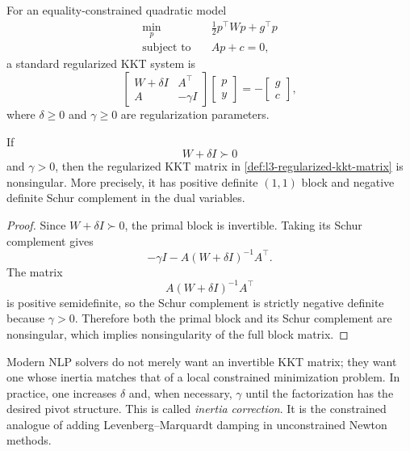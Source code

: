 \begin{definition}\label{def:l3-regularized-kkt-matrix}
	For an equality-constrained quadratic model
	\begin{align*}
		\min_p \quad & \frac{1}{2}p^\top Wp + g^\top p \\
		\text{subject to}\quad & Ap + c = 0,
	\end{align*}
	a standard regularized KKT system is
	\[
		\begin{bmatrix}
			W+\delta I & A^\top \\
			A          & -\gamma I
		\end{bmatrix}
		\begin{bmatrix}
			p \\
			y
		\end{bmatrix}
		=
		-
		\begin{bmatrix}
			g \\
			c
		\end{bmatrix},
	\]
	where $\delta \ge 0$ and $\gamma \ge 0$ are regularization parameters.
\end{definition}

\begin{proposition}\label{prop:l3-quasi-definiteness-under-regularization}
	If
	\[
		W+\delta I \succ 0
	\]
	and $\gamma>0$, then the regularized KKT matrix in \autoref{def:l3-regularized-kkt-matrix} is nonsingular. More precisely, it has positive definite $(1,1)$ block and negative definite Schur complement in the dual variables.
\end{proposition}
\begin{proof}
	Since $W+\delta I \succ 0$, the primal block is invertible. Taking its Schur complement gives
	\[
		-\gamma I - A(W+\delta I)^{-1}A^\top.
	\]
	The matrix
	\[
		A(W+\delta I)^{-1}A^\top
	\]
	is positive semidefinite, so the Schur complement is strictly negative definite because $\gamma>0$. Therefore both the primal block and its Schur complement are nonsingular, which implies nonsingularity of the full block matrix.
\end{proof}

\begin{remark}
	Modern NLP solvers do not merely want an invertible KKT matrix; they want one whose inertia matches that of a local constrained minimization problem. In practice, one increases $\delta$ and, when necessary, $\gamma$ until the factorization has the desired pivot structure. This is called \emph{inertia correction}. It is the constrained analogue of adding Levenberg--Marquardt damping in unconstrained Newton methods.
\end{remark}

